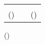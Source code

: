 \begin{singlespace}
	\vspace*{3cm}
	\begin{table}[h!]
		\centering
		\begin{tabular}{c p{3cm} c} 
			\textbf{\guide} & &  \textbf{\hod}\\
			(\guidedes)     & & (\hoddes)
		\end{tabular}
		
	\end{table}
	
	\vspace*{3cm}
	
	\begin{center}
		(\guideextdes)\\
	\end{center}
\end{singlespace}

\thispagestyle{empty}



